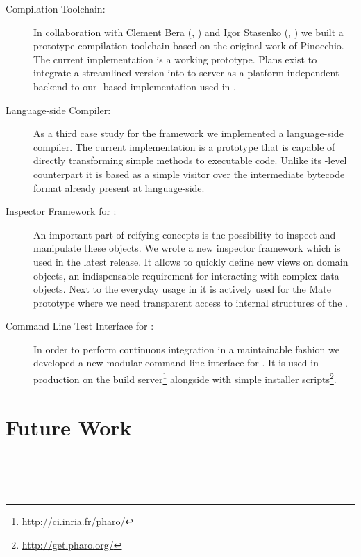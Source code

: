 \begin{description}
	\item[\VirtualCPU Compilation Toolchain:]
In collaboration with Clement Bera (\RMoD, \INRIA) and Igor Stasenko (\RMoD, \INRIA) we built a prototype compilation toolchain based on the original work of Pinocchio.
The current implementation is a working prototype.
Plans exist to integrate a streamlined version into \PH to server as a platform independent backend to our \B-based \FFI implementation used in \PH.

	\item[\NBJ Language-side \JIT Compiler:]
As a third case study for the \B framework we implemented a language-side \JIT compiler. 
The current implementation is a prototype that is capable of directly transforming simple methods to executable code.
Unlike its \VM-level counterpart it is based as a simple visitor over the intermediate bytecode format already present at language-side.

	\item[Inspector Framework for \PH:] 
An important part of reifying concepts is the possibility to inspect and manipulate these objects.
We wrote a new inspector framework which is used in the latest \PH release.
It allows to quickly define new views on domain objects, an indispensable requirement for interacting with complex data objects.
Next to the everyday usage in \PH it is actively used for the Mate \VM prototype where we need transparent access to internal structures of the \VM.

	\item[Command Line Test Interface for \PH:]
In order to perform continuous integration in a maintainable fashion we developed a new modular command line interface for \PH. 
It is used in production on the \PH build server\footnote{\url{http://ci.inria.fr/pharo/}} alongside with simple installer scripts\footnote{\url{http://get.pharo.org/}}.
\end{description}


\section{Future Work}
 \\
 \\
 \\


